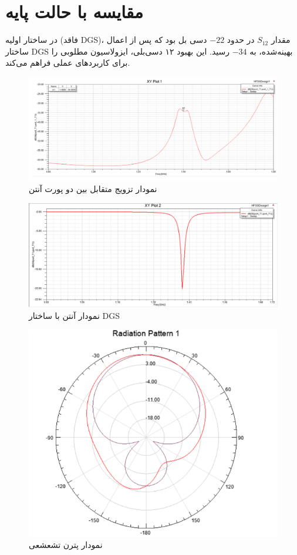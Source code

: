  \section{مقایسه با حالت پایه}
 در ساختار اولیه (فاقد DGS)، مقدار 
 $S_{12}$
 در حدود 
 $-22$
  دسی بل بود که پس از اعمال ساختار DGS بهینه‌شده، به 
  $-34$
    رسید. این بهبود ۱۲ دسی‌بلی، ایزولاسیون مطلوبی را برای کاربردهای عملی فراهم می‌کند.
\begin{figure}
	\centering
	\includegraphics[scale=0.3]{Images/fig31.png}
	\caption{نمودار تزویج متقابل بین دو پورت آنتن}
	\label{fig31}
\end{figure}

\begin{figure}
	\centering
	\includegraphics[scale=0.5]{Images/fig31a.jpg}
	\caption{
	نمودار
	آنتن با ساختار DGS}
\end{figure}   

\begin{figure}
	\centering
	\includegraphics[scale=0.5]{Images/fig32.png}
	\caption{نمودار پترن تشعشعی}
	\label{fig32}
\end{figure}
 
